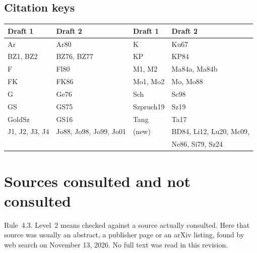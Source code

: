 \documentclass[12pt,letterpaper]{article}
\begin{document}
\subsection{Citation keys}\label{subsec:keys}
\begin{center}
\begin{tabular}{@{}ll@{\qquad}ll@{}}
\toprule
Draft 1 & Draft 2 & Draft 1 & Draft 2\\
\midrule
Ar & Ar80 & K & Ku67\\
BZ1, BZ2 & BZ76, BZ77 & KP & KP84\\
F & Fl80 & M1, M2 & Ma84a, Ma84b\\
FK & FK86 & Mo1, Mo2 & Mo, Mo88\\
G & Ge76 & Sch & Sc98\\
GS & GS75 & Szpruch19 & Sz19\\
GoldSz & GS16 & Tang & Ta17\\
J1, J2, J3, J4 & Jo88, Jo98, Jo99, Jo01 & (new) & BD84, Li12, Lu20,
Mc09,\\
 & & & Ne86, Si79, Sz24\\
\bottomrule
\end{tabular}
\end{center}

\section{Sources consulted and not consulted}

Rule~4.3. Level~2 means checked against a source actually consulted.
Here that source was usually an abstract, a publisher page or an arXiv
listing, found by web search on November 13, 2026. No full text was
read in this revision.
\end{document}

